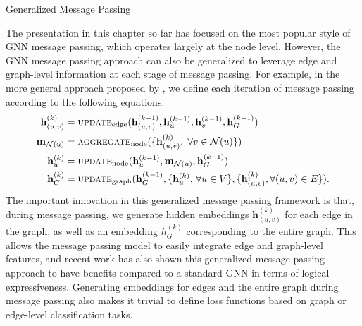 \documentclass[10pt, aspectratio=169, compress, protectframetitle, handout]{beamer}
\begin{document}
\begin{frame}{Generalized Message Passing}

    The presentation in this chapter so far has focused on the most popular style of GNN message passing, which operates largely at the node level. However, the GNN message passing approach can also be generalized to leverage edge and graph-level information at each stage of message passing. For example, in the more general approach proposed by \cite{battaglia2018relational}, we define each iteration of message passing according to the following equations:
    \begin{align}
        \mathbf h^{(k)}_{(u,v)} &= \textsc{update}_\text{edge} (\mathbf h_{(u,v)}^{(k-1)}, \mathbf h_u^{(k-1)}, \mathbf h_v^{(k-1)}, \mathbf h_G^{(k-1)})
        \label{eq:upedge} \\
        \mathbf m_{\mathcal N(u)} &= \textsc{aggregate}_\text{node}(\{ \mathbf h_{(u,v)}^{(k)}, \; \forall v \in \mathcal N(u) \})
        \label{eq:message} \\
        \mathbf h^{(k)}_u &= \textsc{update}_\text{node} ( \mathbf h_u^{(k-1)}, \mathbf m_{\mathcal N(u)}, \mathbf h_G^{(k-1)})
        \label{eq:upnode} \\
        \mathbf h^{(k)}_G &= \textsc{update}_\text{graph}(\mathbf h_G^{( k-1)}, \{ \mathbf h_u^{(k)}, \, \forall u \in V\}, \{ \mathbf h_{(u,v)}^{(k)}, \forall (u, v) \in E\}).
        \label{eq:upgraph}
    \end{align}
    The important innovation in this generalized message passing framework is that, during message passing, we generate hidden embeddings $\mathbf h_{(u,v)}^{(k)}$ for each edge in the graph, as well as an embedding $h_G^{(k)}$ corresponding to the entire graph. This allows the message passing model to easily integrate edge and graph-level features, and recent work has also shown this generalized message passing approach to have benefits compared to a standard GNN in terms of logical expressiveness. Generating embeddings for edges and the entire graph during message passing also makes it trivial to define loss functions based on graph or edge-level classification tasks.
    
\end{frame}
\end{document}

